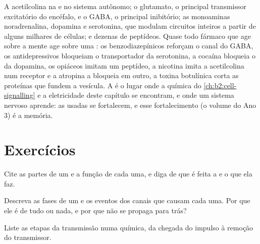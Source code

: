 \begin{example}\label{ex:b2:neurons-synapses:transmitters}
A acetilcolina na  e no sistema autônomo; o
glutamato, o principal transmissor excitatório do encéfalo, e o GABA,
o principal inibitório; as monoaminas noradrenalina, dopamina e
serotonina, que modulam circuitos inteiros a partir de alguns milhares
de células; e dezenas de peptídeos. Quase todo fármaco que age sobre a
mente age sobre uma : os benzodiazepínicos reforçam o canal do
GABA, os antidepressivos bloqueiam o transportador da serotonina, a
cocaína bloqueia o da dopamina, os opiáceos imitam um peptídeo, a
nicotina imita a acetilcolina num receptor e a atropina a bloqueia em
outro, a toxina botulínica corta as proteínas que fundem a vesícula. A
 é o lugar onde a química do \cref{ch:b2:cell-signalling} e a eletricidade deste
capítulo se encontram, e onde um sistema nervoso aprende: as 
usadas se fortalecem, e esse fortalecimento (o volume do Ano 3) é a
memória.
\end{example}

\section{Exercícios}

\begin{exercise}[$\star$]\label{exo:b2:neurons-synapses:1}
Cite as partes de um  e a função de cada uma, e diga de que é
feita a  e o que ela faz.
\end{exercise}

\begin{exercise}[$\star$]\label{exo:b2:neurons-synapses:2}
Descreva as fases de um  e os eventos dos canais que
causam cada uma. Por que ele é de tudo ou nada, e por que não se
propaga para trás?
\end{exercise}

\begin{exercise}[$\star$]\label{exo:b2:neurons-synapses:3}
Liste as etapas da transmissão numa  química, da chegada do
impulso à remoção do transmissor.
\end{exercise}


